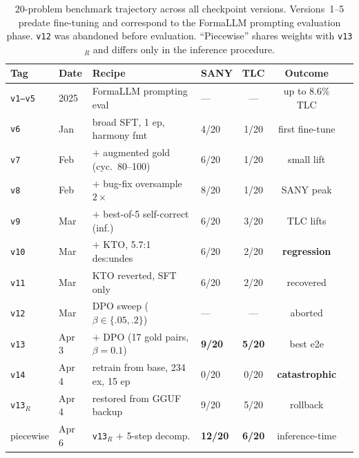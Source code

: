 \documentclass[11pt]{article}
\begin{document}
\begin{table}[t]
\centering
\small
\setlength{\tabcolsep}{4pt}
\begin{tabular}{@{}llllccl@{}}
\toprule
Tag & Date & Recipe & SANY & TLC & Outcome \\
\midrule
\texttt{v1--v5} & 2025 & FormaLLM prompting eval
  & --- & --- & up to 8.6\% TLC \\
\texttt{v6}  & Jan & broad SFT, 1 ep, harmony fmt
  & 4/20 & 1/20 & first fine-tune \\
\texttt{v7}  & Feb & $+$ augmented gold (cyc.\ 80--100)
  & 6/20 & 1/20 & small lift \\
\texttt{v8}  & Feb & $+$ bug-fix oversample $2\times$
  & 8/20 & 1/20 & SANY peak \\
\texttt{v9}  & Mar & $+$ best-of-5 self-correct (inf.)
  & 6/20 & 3/20 & TLC lifts \\
\texttt{v10} & Mar & $+$ KTO, 5.7:1 des:undes
  & 6/20 & 2/20 & \textbf{regression} \\
\texttt{v11} & Mar & KTO reverted, SFT only
  & 6/20 & 2/20 & recovered \\
\texttt{v12} & Mar & DPO sweep ($\beta\!\in\!\{.05,.2\}$)
  & ---  & ---  & aborted \\
\texttt{v13} & Apr 3 & $+$ DPO (17 gold pairs, $\beta\!=\!0.1$)
  & \textbf{9/20} & \textbf{5/20} & best e2e \\
\texttt{v14} & Apr 4 & retrain from base, 234 ex, 15 ep
  & 0/20 & 0/20 & \textbf{catastrophic} \\
\texttt{v13}$_R$ & Apr 4 & restored from GGUF backup
  & 9/20 & 5/20 & rollback \\
piecewise & Apr 6 & \texttt{v13}$_R$ $+$ 5-step decomp.
  & \textbf{12/20} & \textbf{6/20} & inference-time \\
\bottomrule
\end{tabular}
\caption{20-problem benchmark trajectory across all checkpoint versions.
Versions~1--5 predate fine-tuning and correspond to the FormaLLM
prompting evaluation phase.  \texttt{v12} was abandoned before
evaluation.  ``Piecewise'' shares weights with \texttt{v13}$_R$ and
differs only in the inference procedure.}
\label{tab:run-history}
\end{table}
\end{document}

